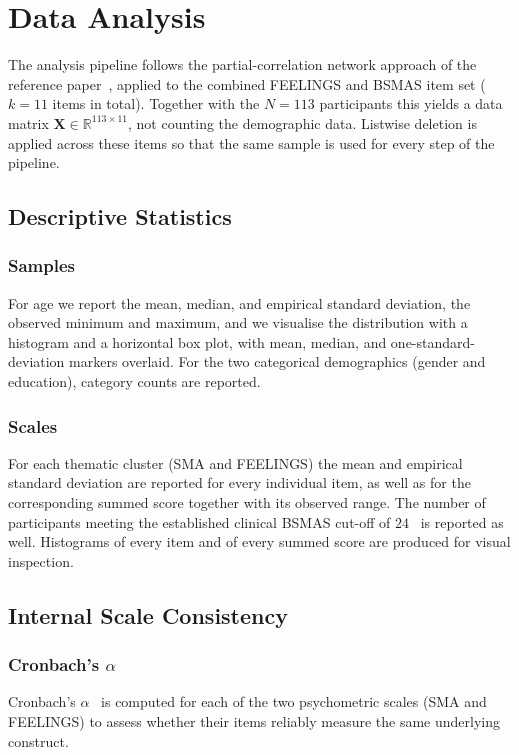 \documentclass{article}
\begin{document}
\section{Data Analysis}

The analysis pipeline follows the partial-correlation network approach
of the reference paper~\parencite{wang2025dark}, applied to the combined
FEELINGS and BSMAS item set ($k = 11$ items in total). Together with the
$N = 113$ participants this yields a data matrix
$\mathbf{X} \in \mathbb{R}^{113 \times 11}$, not counting the demographic
data. Listwise deletion is applied across these items so that the same
sample is used for every step of the pipeline.

\subsection{Descriptive Statistics}

\subsubsection{Samples}
For age we report the mean, median, and empirical standard deviation,
the observed minimum and maximum, and we visualise the distribution with
a histogram and a horizontal box plot, with mean, median, and
one-standard-deviation markers overlaid. For the two categorical
demographics (gender and education), category counts are reported.

\subsubsection{Scales}
For each thematic cluster (SMA and FEELINGS) the mean and empirical
standard deviation are reported for every individual item, as well as
for the corresponding summed score together with its observed range. The
number of participants meeting the established clinical BSMAS cut-off of
$24$~\parencite{luo2021bsmas} is reported as well. Histograms of every
item and of every summed score are produced for visual inspection.

\subsection{Internal Scale Consistency}

\subsubsection{Cronbach's $\alpha$}
Cronbach's $\alpha$~\parencite{cronbach1951coefficient} is computed for
each of the two psychometric scales (SMA and FEELINGS) to assess whether
their items reliably measure the same underlying construct.
\end{document}
